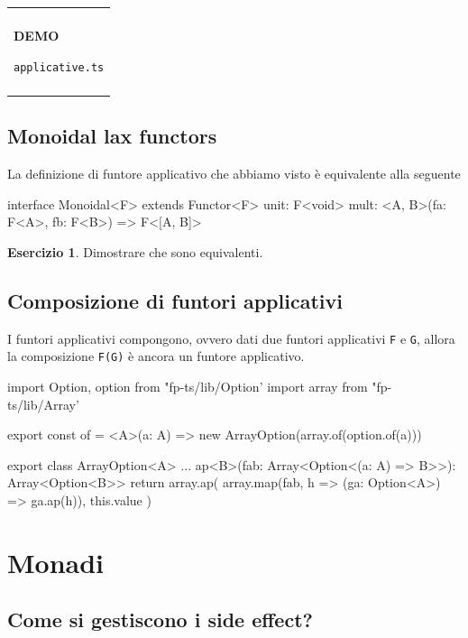\documentclass[12pt]{article}
\theoremstyle{definition}
\newtheorem{exercise}{Esercizio}[section]
\newenvironment{demo}
    {\begin{center}
    \begin{tabular}{|p{0.9\textwidth}|}
    \hline\\
    }
    {
    \\\\\hline
    \end{tabular}
    \end{center}
    }
\newenvironment{code}
  {\vspace{0.5cm} \VerbatimEnvironment\begin{typescriptcode}}
  {\end{typescriptcode} \vspace{0.2cm}}
\begin{document}
\begin{demo}
\begin{center}
\textbf{DEMO}

\texttt{applicative.ts}
\end{center}
\end{demo}

\subsection{Monoidal lax functors}

La definizione di funtore applicativo che abbiamo visto è equivalente alla seguente

\begin{code}
interface Monoidal<F> extends Functor<F> {
  unit: F<void>
  mult: <A, B>(fa: F<A>, fb: F<B>) => F<[A, B]>
}
\end{code}

\begin{exercise}
Dimostrare che sono equivalenti.
\end{exercise}

\subsection{Composizione di funtori applicativi}

I funtori applicativi compongono, ovvero dati due funtori applicativi \texttt{F} e \texttt{G},
allora la composizione \texttt{F(G)} è ancora un funtore applicativo.

\begin{code}
import { Option, option } from "fp-ts/lib/Option'
import { array } from "fp-ts/lib/Array'

export const of = <A>(a: A) =>
  new ArrayOption(array.of(option.of(a)))

export class ArrayOption<A> {
  ...
  ap<B>(fab: Array<Option<(a: A) => B>>): Array<Option<B>> {
    return array.ap(
      array.map(fab, h => (ga: Option<A>) => ga.ap(h)),
      this.value
    )
  }
}
\end{code}

\newpage

\section{Monadi}

\subsection{Come si gestiscono i side effect?}
\end{document}
